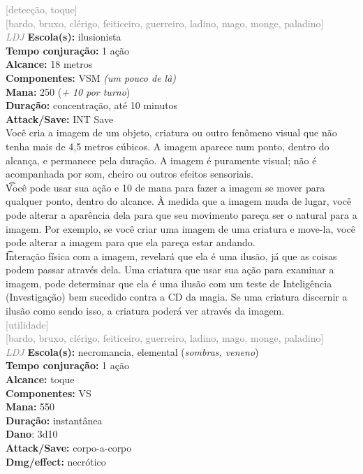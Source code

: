 \documentclass{RPG_Adventure}[2021/10/20]
\begin{document}
{\scriptsize \textcolor{gray}{[detecção, toque]\\}}
{\scriptsize \textcolor{gray}{[bardo, bruxo, clérigo, feiticeiro, guerreiro, ladino, mago, monge, paladino]\\}}
{\tiny \textcolor{gray}{\textit{LDJ}}}
{\small \t \textbf{Escola(s):} ilusionista\\\t \textbf{Tempo conjuração:} 1 ação\\\t \textbf{Alcance:} 18 metros\\\t \textbf{Componentes:} VSM \textit{(um pouco de lã)}\\\t \textbf{Mana:} 250 (\textit{+ 10 por turno})\\\t \textbf{Duração:} concentração, até 10 minutos\\\t \textbf{Attack/Save:} INT Save\\}
{\normalsize Você cria a imagem de um objeto, criatura ou outro fenômeno visual que não tenha mais de 4,5 metros cúbicos. A imagem aparece num ponto, dentro do alcança, e permanece pela duração. A imagem é puramente visual; não é acompanhada por som, cheiro ou outros efeitos sensoriais.\\\t Você pode usar sua ação e 10 de mana para fazer a imagem se mover para qualquer ponto, dentro do alcance. À medida que a imagem muda de lugar, você pode alterar a aparência dela para que seu movimento pareça ser o natural para a imagem. Por exemplo, se você criar uma imagem de uma criatura e move-la, você pode alterar a imagem para que ela pareça estar andando.\\\t Interação física com a imagem, revelará que ela é uma ilusão, já que as coisas podem passar através dela. Uma criatura que usar sua ação para examinar a imagem, pode determinar que ela é uma ilusão com um teste de Inteligência (Investigação) bem sucedido contra a CD da magia. Se uma criatura discernir a ilusão como sendo isso, a criatura poderá ver através da imagem.\\}
{\scriptsize \textcolor{gray}{[utilidade]\\}}
{\scriptsize \textcolor{gray}{[bardo, bruxo, clérigo, feiticeiro, guerreiro, ladino, mago, monge, paladino]\\}}
{\tiny \textcolor{gray}{\textit{LDJ}}}
{\small \t \textbf{Escola(s):} necromancia, elemental (\textit{sombras, veneno})\\\t \textbf{Tempo conjuração:} 1 ação\\\t \textbf{Alcance:} toque\\\t \textbf{Componentes:} VS\\\t \textbf{Mana:} 550\\\t \textbf{Duração:} instantânea\\\t \textbf{Dano}: 3d10\\\t \textbf{Attack/Save:} corpo-a-corpo\\\t \textbf{Dmg/effect:} necrótico\\}
\end{document}
